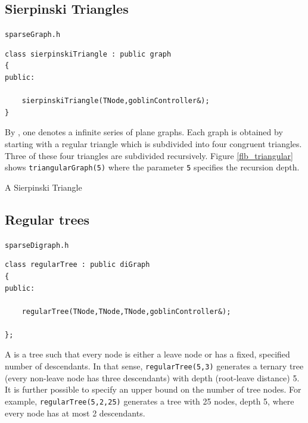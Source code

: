 \documentclass[a4paper,11pt,twoside]{book}
\begin{document}
\begin{multicols}{2}
\subsection{Sierpinski Triangles}
\myinclude\verb/sparseGraph.h/
\begin{mymethods}
\begin{verbatim}
class sierpinskiTriangle : public graph
{
public:

    sierpinskiTriangle(TNode,goblinController&);
}
\end{verbatim}
\end{mymethods}
By , one denotes a infinite series of plane graphs.
Each graph is obtained by starting with a regular triangle which is subdivided
into four congruent triangles. Three of these four triangles are subdivided
recursively. Figure \ref{flb_triangular} shows \verb/triangularGraph(5)/ where
the parameter \verb/5/ specifies the recursion depth. 

\bigskip
\begin{figurehere}
\begin{center}
\epsfxsize=7cm
\vspace{0.5cm}
\caption{\label{flb_sierpinski}A Sierpinski Triangle}
\end{center}
\end{figurehere}



\subsection{Regular trees}
\myinclude\verb/sparseDigraph.h/
\begin{mymethods}
\begin{verbatim}
class regularTree : public diGraph
{
public:

    regularTree(TNode,TNode,TNode,goblinController&);

};
\end{verbatim}
\end{mymethods}
A  is a tree such that every node is either a leave node
or has a fixed, specified number of descendants. In that sense,
\verb/regularTree(5,3)/ generates a ternary tree (every non-leave node has
three descendants) with depth (root-leave distance) 5. It is further
possible to specify an upper bound on the number of tree nodes. For example,
\verb/regularTree(5,2,25)/ generates a tree with 25 nodes, depth 5, where
every node has at most 2 descendants.




\end{multicols}
\end{document}
